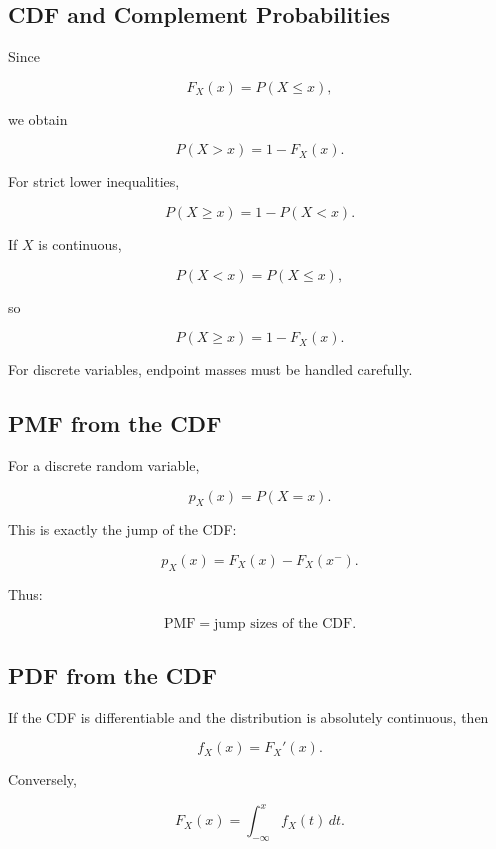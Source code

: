 \subsection{CDF and Complement Probabilities}
\label{subsec:cdf-complements}

Since

\[
F_X(x)=P(X\leq x),
\]

we obtain

\[
\boxed{
P(X>x)=1-F_X(x).
}
\]

For strict lower inequalities,

\[
P(X\geq x)
=
1-P(X<x).
\]

If \(X\) is continuous,

\[
P(X<x)=P(X\leq x),
\]

so

\[
\boxed{
P(X\geq x)=1-F_X(x).
}
\]

For discrete variables, endpoint masses must be handled carefully.

\subsection{PMF from the CDF}
\label{subsec:pmf-from-cdf}

For a discrete random variable,

\[
p_X(x)
=
P(X=x).
\]

This is exactly the jump of the CDF:

\[
\boxed{
p_X(x)
=
F_X(x)-F_X(x^-).
}
\]

Thus:

\[
\boxed{
\text{PMF}
=
\text{jump sizes of the CDF}.
}
\]

\subsection{PDF from the CDF}
\label{subsec:pdf-from-cdf}

If the CDF is differentiable and the distribution is absolutely
continuous, then

\[
\boxed{
f_X(x)=F_X'(x).
}
\]

Conversely,

\[
\boxed{
F_X(x)
=
\int_{-\infty}^{x}f_X(t)\,dt.
}
\]

